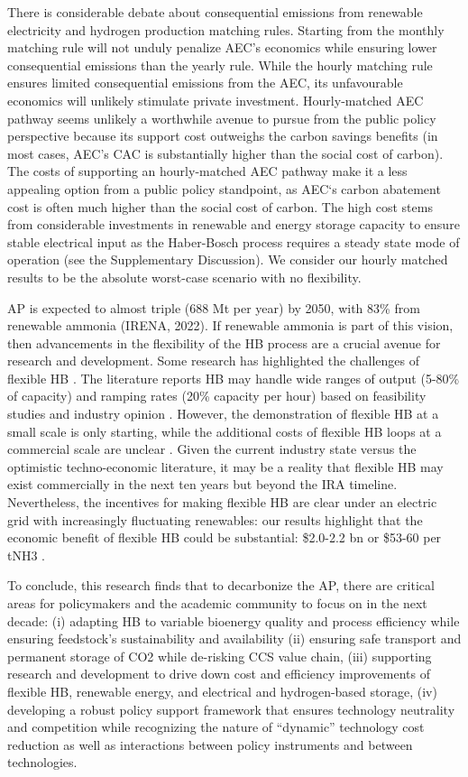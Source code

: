 \documentclass{article}
\begin{document}
There is considerable debate about consequential emissions from renewable electricity and hydrogen production matching rules. Starting from the monthly matching rule will not unduly penalize AEC’s economics while ensuring lower consequential emissions than the yearly rule. While the hourly matching rule ensures limited consequential emissions from the AEC, its unfavourable economics will unlikely stimulate private investment. Hourly-matched AEC pathway seems unlikely a worthwhile avenue to pursue from the public policy perspective because its support cost outweighs the carbon savings benefits (in most cases, AEC’s CAC is substantially higher than the social cost of carbon). The costs of supporting an hourly-matched AEC pathway make it a less appealing option from a public policy standpoint, as AEC‘s carbon abatement cost is often much higher than the social cost of carbon. The high cost stems from considerable investments in renewable and energy storage capacity to ensure stable electrical input as the Haber-Bosch process requires a steady state mode of operation (see the Supplementary Discussion). We consider our hourly matched results to be the absolute worst-case scenario with no flexibility.

AP is expected to almost triple (688 Mt per  year) by 2050, with 83\% from renewable ammonia (IRENA, 2022). If renewable ammonia is part of this vision, then advancements in the flexibility of the HB process are a crucial avenue for research and development. Some research has highlighted the challenges of flexible HB . The literature reports HB may handle wide ranges of output (5-80\% of capacity) and ramping rates (20\% capacity per  hour) based on feasibility studies and industry opinion \cite{Armijo2020, Verleysen2023, Lazouski2022}. However, the demonstration of flexible HB at a small scale is only starting, while the additional costs of flexible HB loops at a commercial scale are unclear \cite{Rouwenhorst2023, Davenne2022}. Given the current industry state versus the optimistic techno-economic literature, it may be a reality that flexible HB may exist commercially in the next ten years but beyond the IRA timeline. Nevertheless, the incentives for making flexible HB are clear under an electric grid with increasingly fluctuating renewables: our results highlight that the economic benefit of flexible HB could be substantial: \$2.0-2.2 bn or \$53-60 per  tNH3 .

To conclude, this research finds that to decarbonize the AP, there are critical areas for policymakers and the academic community to focus on in the next decade: (i) adapting HB to variable bioenergy quality and process efficiency while ensuring feedstock’s sustainability and availability (ii) ensuring safe transport and permanent storage of CO2 while de-risking CCS value chain, (iii) supporting research and development to drive down cost and efficiency improvements of flexible HB, renewable energy, and electrical and hydrogen-based storage, (iv) developing a robust policy support framework that ensures technology neutrality and competition while recognizing the nature of “dynamic” technology cost reduction \cite{Gillingham2018} as well as interactions between policy instruments and between technologies.
\end{document}
